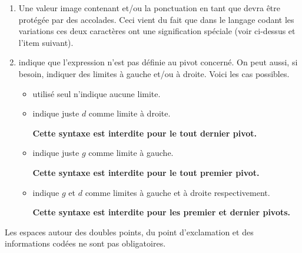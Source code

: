 \begin{enumerate}
\begin{itemize}
\begin{enumerate}
            \item Une valeur image contenant  et/ou la ponctuation \tdoclatexin{!} en tant que  devra être protégée par des accolades. Ceci vient du fait que dans le langage codant les variations ces deux caractères ont une signification spéciale (voir ci-dessus et l'item suivant).

            \item \tdoclatexin{!} indique que
l'expression n'est pas définie au pivot concerné.
            On peut aussi, si besoin, indiquer des limites à gauche et/ou à droite. Voici les cas possibles.
            \begin{itemize}
                \item \tdoclatexin{!} utilisé seul n'indique aucune limite.


                \item  {} indique juste $d$ comme limite à droite.

                \textbf{Cette syntaxe est interdite pour le tout dernier pivot.}


                \item {} indique juste $g$ comme limite à gauche.

                \textbf{Cette syntaxe est interdite pour le tout premier pivot.}


                \item  {} indique $g$ et $d$ comme limites à gauche et à droite respectivement.

                \textbf{Cette syntaxe est interdite pour les premier et dernier pivots.}
            \end{itemize}
        \end{enumerate}
    \end{itemize}
\end{enumerate}








\begin{tdocnote}
    Les espaces autour des doubles points, du point d'exclamation et des informations codées ne sont pas obligatoires.
\end{tdocnote}


